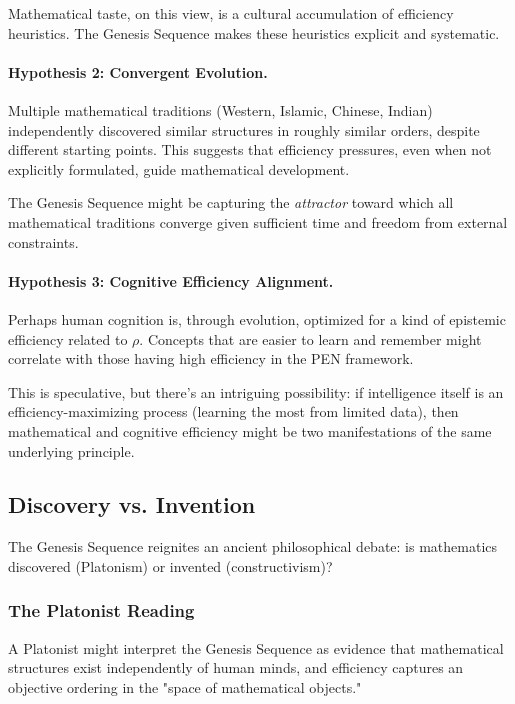 \documentclass[11pt]{article}
\theoremstyle{definition}
\begin{document}
Mathematical taste, on this view, is a cultural accumulation of efficiency heuristics. The Genesis Sequence makes these heuristics explicit and systematic.

\paragraph{Hypothesis 2: Convergent Evolution.}
Multiple mathematical traditions (Western, Islamic, Chinese, Indian) independently discovered similar structures in roughly similar orders, despite different starting points. This suggests that efficiency pressures, even when not explicitly formulated, guide mathematical development.

The Genesis Sequence might be capturing the \emph{attractor} toward which all mathematical traditions converge given sufficient time and freedom from external constraints.

\paragraph{Hypothesis 3: Cognitive Efficiency Alignment.}
Perhaps human cognition is, through evolution, optimized for a kind of epistemic efficiency related to $\rho$. Concepts that are easier to learn and remember might correlate with those having high efficiency in the PEN framework.

This is speculative, but there's an intriguing possibility: if intelligence itself is an efficiency-maximizing process (learning the most from limited data), then mathematical and cognitive efficiency might be two manifestations of the same underlying principle.

\subsection{Discovery vs. Invention}

The Genesis Sequence reignites an ancient philosophical debate: is mathematics discovered (Platonism) or invented (constructivism)?

\subsubsection{The Platonist Reading}

A Platonist might interpret the Genesis Sequence as evidence that mathematical structures exist independently of human minds, and efficiency captures an objective ordering in the "space of mathematical objects."
\end{document}
